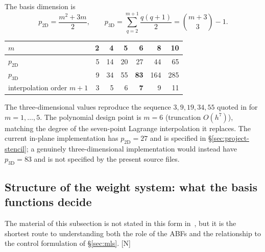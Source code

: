 \documentclass[11pt,a4paper]{article}
\newcommand{\New}{\textcolor{blue!60!black}{\textsf{[N]}}}
\begin{document}
The basis dimension is \cite[Eqs.~(15),(16)]{KLN2020}
\begin{equation}
p_{\mathrm{2D}}=\frac{m^{2}+3m}{2},
\qquad
p_{\mathrm{3D}}=\sum_{q=2}^{m+1}\frac{q(q+1)}{2}=\binom{m+3}{3}-1 .
\label{eq:p}
\end{equation}

\begin{center}
\begin{tabular}{lrrrrrr}
\toprule
$m$ & 2 & 4 & 5 & 6 & 8 & 10\\
\midrule
$p_{\mathrm{2D}}$ & 5 & 14 & 20 & 27 & 44 & 65\\
$p_{\mathrm{3D}}$ & 9 & 34 & 55 & \textbf{83} & 164 & 285\\
interpolation order $m+1$ & 3 & 5 & 6 & \textbf{7} & 9 & 11\\
\bottomrule
\end{tabular}
\end{center}

\noindent The three-dimensional values reproduce the sequence $3,9,19,34,55$ quoted
in \cite[Eq.~(16)]{KLN2020} for $m=1,\dots,5$. The polynomial design point is
$m=6$ (truncation $O(h^{7})$), matching the degree of the seven-point Lagrange
interpolation it replaces. The current in-plane implementation has
$p_{\mathrm{2D}}=27$ and is specified in \S\ref{sec:project-stencil}; a genuinely
three-dimensional implementation would instead have $p_{\mathrm{3D}}=83$ and is not
specified by the present source files.

\subsection{Structure of the weight system: what the basis functions decide}
\label{sec:structure}

The material of this subsection is not stated in this form in~\cite{KLN2020,KL2021},
but it is the shortest route to understanding both the role of the ABFs and the
relationship to the control formulation of \S\ref{sec:mls}. \New
\end{document}
